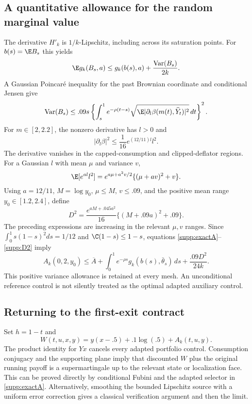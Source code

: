 \subsection{A quantitative allowance for the random marginal value}
The derivative $H'_k$ is $1/k$-Lipschitz, including across its saturation points. For $b(s)=\E B_s$ this yields
\[
 \E g_k(B_s,a)\leq g_k(b(s),a)+\frac{\operatorname{Var}(B_s)}{2k}.
\]
A Gaussian Poincar\'e inequality for the past Brownian coordinate and conditional Jensen give
\[
 \operatorname{Var}(B_s)
 \leq .09s\left\{\int_s^1e^{-\rho(t-s)}
           \sqrt{\E|\partial_l\beta(m(t),\widehat Y_t)|^2}\,dt\right\}^2.
\]
For $m\in[2,2.2]$, the nonzero derivative has $l>0$ and
\[
 |\partial_l\beta|^2
 \leq \frac1{16}e^{(12/11)l}l^2.
\]
The derivative vanishes in the capped-consumption and clipped-deflator regions. For a Gaussian $l$ with mean $\mu$ and variance $v$,
\[
 \E[e^{al}l^2]=e^{a\mu+a^2v/2}\{(\mu+av)^2+v\}.
\]
Using $a=12/11$, $M=\log y_0$, $\mu\leq M$, $v\leq.09$, and the positive mean range $y_0\in[1.2,2.4]$, define
\begin{equation}
 D^2=\frac{e^{aM+.045a^2}}{16}\{(M+.09a)^2+.09\}.\label{supp:D2}
\end{equation}
The preceding expressions are increasing in the relevant $\mu,v$ ranges. Since
$\int_0^1s(1-s)^2ds=1/12$ and $\C(1-s)\leq1-s$, equations \eqref{supp:exactA}--\eqref{supp:D2} imply
\begin{equation}
 A_k(0,2,y_0)\leq\overline A+
 \int_0^1e^{-\rho s}g_k(b(s),\bar\theta_s)\,ds
 +\frac{.09D^2}{24k}.\label{supp:computable}
\end{equation}
This positive variance allowance is retained at every mesh. An unconditional reference control is not silently treated as the optimal adapted auxiliary control.

\subsection{Returning to the first-exit contract}
Set $h=1-t$ and
\[
 W(t,u,x,y)=y(x-.5)+.1\log(.5)+A_k(t,u,y).
\]
The product identity for $Yx$ cancels every adapted portfolio control. Consumption conjugacy and the supporting plane imply that discounted $W$ plus the original running payoff is a supermartingale up to the relevant state or localization face. This can be proved directly by conditional Fubini and the adapted selector in \eqref{supp:exactA}. Alternatively, smoothing the bounded Lipschitz source with a uniform error correction gives a classical verification argument and then the limit.


